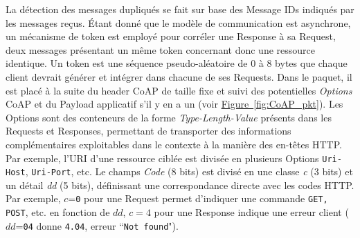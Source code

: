 \documentclass[]{report}
\newcommand{\wordlink}[2]{\hyperref[#2]{#1~\ref{#2}}}
\begin{document}
\vspace{0.2cm}

\par La détection des messages dupliqués se fait sur base des Message IDs indiqués par les messages reçus. Étant donné que le modèle de communication est asynchrone, un mécanisme de token est employé pour corréler une Response à sa Request, deux messages présentant un même token concernant donc une ressource identique. Un token est une séquence pseudo-aléatoire de 0 à 8 bytes que chaque client devrait générer et intégrer dans chacune de ses Requests. Dans le paquet, il est placé à la suite du header CoAP de taille fixe et suivi des potentielles \textit{Options} CoAP et du Payload applicatif s'il y en a un (voir \wordlink{Figure}{fig:CoAP_pkt}). Les Options sont des conteneurs de la forme \textit{Type-Length-Value} présents dans les Requests et Responses, permettant de transporter des informations complémentaires exploitables dans le contexte à la manière des en-têtes HTTP. Par exemple, l'URI d'une ressource ciblée est divisée en plusieurs Options \texttt{Uri-Host}, \texttt{Uri-Port}, etc. Le champs \textit{Code} (8 bits) est divisé en une classe \textit{c} (3 bits) et un détail \textit{dd} (5 bits), définissant une correspondance directe avec les codes HTTP. Par exemple, $c$=\texttt{0} pour une Request permet d'indiquer une commande \texttt{GET, POST}, etc. en fonction de $dd$, $c=4$ pour une Response indique une erreur client ($dd$=\texttt{04} donne \texttt{4.04}, erreur ``\texttt{Not found}").
\end{document}
